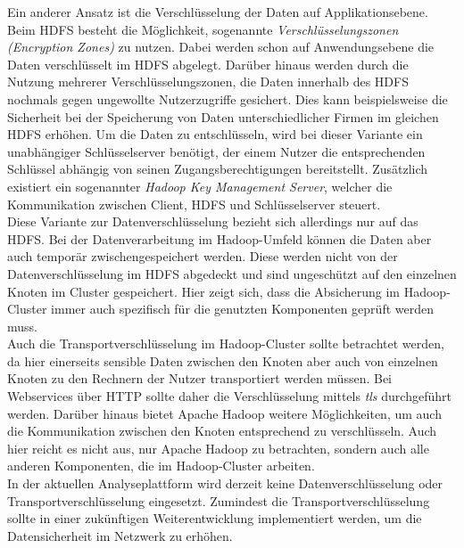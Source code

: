 \noindent
Ein anderer Ansatz ist die Verschlüsselung der Daten auf Applikationsebene. Beim HDFS besteht die Möglichkeit, sogenannte \textit{Verschlüsselungszonen (Encryption Zones)} zu nutzen. Dabei werden schon auf Anwendungsebene die Daten verschlüsselt im HDFS abgelegt. 
Darüber hinaus werden durch die Nutzung mehrerer Verschlüsselungszonen, die Daten innerhalb des HDFS nochmals gegen ungewollte Nutzerzugriffe gesichert. Dies kann beispielsweise die Sicherheit bei der Speicherung von Daten unterschiedlicher Firmen im gleichen HDFS erhöhen. Um die Daten zu entschlüsseln, wird bei dieser Variante ein unabhängiger Schlüsselserver benötigt, der einem Nutzer die entsprechenden Schlüssel abhängig von seinen Zugangsberechtigungen bereitstellt. Zusätzlich existiert ein sogenannter \textit{Hadoop Key Management Server}, welcher die Kommunikation zwischen Client, HDFS und Schlüsselserver steuert.\cite[S. 192-200]{hadoop_security}\\
Diese Variante zur Datenverschlüsselung bezieht sich allerdings nur auf das HDFS. Bei der Datenverarbeitung im Hadoop-Umfeld können die Daten aber auch temporär zwischengespeichert werden. Diese werden nicht von der Datenverschlüsselung im HDFS abgedeckt und sind ungeschützt auf den einzelnen Knoten im Cluster gespeichert. Hier zeigt sich, dass die Absicherung im Hadoop-Cluster immer auch spezifisch für die genutzten Komponenten geprüft werden muss. \\

\noindent
Auch die Transportverschlüsselung im Hadoop-Cluster sollte betrachtet werden, da hier einerseits sensible Daten zwischen den Knoten aber auch von einzelnen Knoten zu den Rechnern der Nutzer transportiert werden müssen. Bei Webservices über HTTP sollte daher die Verschlüsselung mittels \textit{\gls{tls}} durchgeführt werden. Darüber hinaus bietet Apache Hadoop weitere Möglichkeiten, um auch die Kommunikation zwischen den Knoten entsprechend zu verschlüsseln. Auch hier reicht es nicht aus, nur Apache Hadoop zu betrachten, sondern auch alle anderen Komponenten, die im Hadoop-Cluster arbeiten. \cite[S. 207-216]{hadoop_security}\\

\noindent
In der aktuellen Analyseplattform wird derzeit keine Datenverschlüsselung oder Transportverschlüsselung eingesetzt. Zumindest die Transportverschlüsselung sollte in einer zukünftigen Weiterentwicklung implementiert werden, um die Datensicherheit im Netzwerk zu erhöhen.


